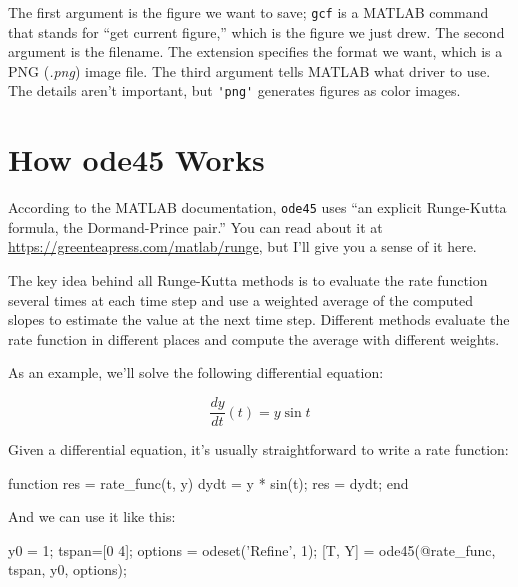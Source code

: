 \documentclass[../../book.tex]{subfiles}
\begin{document}
The first argument is the figure we want to save; \lstinline{gcf} is a MATLAB command that stands for ``get current figure,'' which is the figure we just drew.  The second argument is the filename.  The extension specifies the format we want, which is a PNG (\emph{.png}) image file.  The third argument tells MATLAB what driver to use.  The details aren't important, but \lstinline{'png'} generates figures as color images.



\section{How ode45 Works}
\label{s:howode45}

According to the MATLAB documentation, \lstinline{ode45} uses ``an explicit Runge-Kutta formula, the Dormand-Prince pair.''  You can read about it at  \url{https://greenteapress.com/matlab/runge}, but I'll give you a sense of it here.


The key idea behind all Runge-Kutta methods is to evaluate the rate function several times at each time step and use a weighted average of the computed slopes to estimate the value at the next time step.
Different methods evaluate the rate function in different places and compute the average with different weights.


As an example, we'll solve the following differential equation:

\[ \frac{dy}{dt}(t) = y \sin t \]

Given a differential equation, it's usually straightforward to write a rate function:

\begin{code}
function res = rate_func(t, y)
    dydt = y * sin(t);
    res = dydt;
end
\end{code}

And we can use it like this:

\begin{code}
    y0 = 1;
    tspan=[0 4];
    options = odeset('Refine', 1);
    [T, Y] = ode45(@rate_func, tspan, y0, options);
\end{code}
\end{document}

